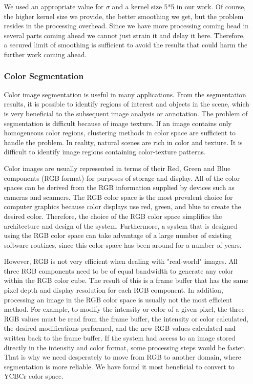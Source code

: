 We used an appropriate value for $\sigma$ and a kernel size 5*5 in our work. Of course, the higher 
kernel size we provide, the better smoothing we get, but the problem resides in the processing 
overhead. Since we have more processing coming head in several parts coming ahead we cannot 
just strain it and delay it here. Therefore, a secured limit of smoothing is sufficient to avoid the 
results that could harm the further work coming ahead. 
\bigskip


\subsubsection{Color Segmentation }
Color image segmentation is useful in many applications. From the segmentation results, it is 
possible to identify regions of interest and objects in the scene, which is very beneficial to the 
subsequent image analysis or annotation. The problem of segmentation is difficult because of 
image texture. If an image contains only homogeneous color regions, clustering methods in color 
space are sufficient to handle the problem. In reality, natural scenes are rich in color and texture. 
It is difficult to identify image regions containing color-texture patterns.\bigskip

Color images are usually represented in terms of their Red, Green and Blue components (RGB 
format) for purposes of storage and display. All of the color spaces can be derived from the RGB 
information supplied by devices such as cameras and scanners. The RGB color space is the most 
prevalent choice for computer graphics because color displays use red, green, and blue to create 
the desired color. Therefore, the choice of the RGB color space simplifies the architecture and 
design of the system. Furthermore, a system that is designed using the RGB color space can 
take advantage of a large number of existing software routines, since this color space has been 
around for a number of years.  \bigskip

However, RGB is not very efficient when dealing with "real-world" images. All three RGB 
components need to be of equal bandwidth to generate any color within the RGB color cube. 
The result of this is a frame buffer that has the same pixel depth and display resolution for each RGB component. In addition, processing an image in the RGB color space is usually not the 
most efficient method. For example, to modify the intensity or color of a given pixel, the three 
RGB values must be read from the frame buffer, the intensity or color calculated, the desired 
modifications performed, and the new RGB values calculated and written back to the frame 
buffer. If the system had access to an image stored directly in the intensity and color format, 
some processing steps would be faster. That is why we need desperately to move from RGB to 
another domain, where segmentation is more reliable. We have found it most beneficial to 
convert to YCBCr color space. \bigskip

